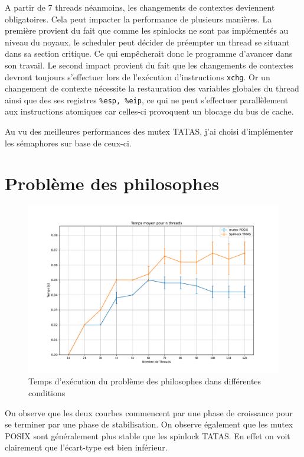 \noindent A partir de 7 threads néanmoins, les changements de contextes deviennent obligatoires. Cela peut impacter la performance de plusieurs manières. La première provient du fait que comme les spinlocks ne sont pas implémentés au niveau du noyaux, le scheduler peut décider de préempter un thread se situant dans sa section critique. Ce qui empêcherait donc le programme d'avancer dans son travail. Le second impact provient du fait que les changements de contextes devront toujours s'effectuer lors de l'exécution d'instructions \texttt{xchg}. Or un changement de contexte nécessite la restauration des variables globales du thread ainsi que des ses registres \texttt{\%esp, \%eip}, ce qui ne peut s'effectuer parallèlement aux instructions atomiques car celles-ci provoquent un blocage du bus de cache.

\noindent Au vu des meilleures performances des mutex TATAS, j'ai choisi d'implémenter les sémaphores sur base de ceux-ci.
\section{Problème des philosophes}

\begin{figure}[H]
    \centering
    \includegraphics[scale=0.4]{img/philosophes.pdf}
    \caption{Temps d'exécution du problème des philosophes dans différentes conditions}
    \label{pic:philo}
\end{figure}

\noindent On observe que les deux courbes commencent par une phase de croissance pour se terminer par une phase de stabilisation.
On observe également que les mutex POSIX sont généralement plus stable que les spinlock TATAS. En effet on voit clairement que l'écart-type est bien inférieur. \\

